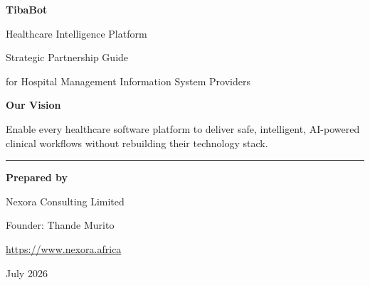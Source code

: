 
\thispagestyle{empty}

\vspace*{1cm}

{\Huge\bfseries\color{Primary}
TibaBot
}

\vspace{3mm}

{\LARGE Healthcare Intelligence Platform}

\vspace{8mm}

{\Large
Strategic Partnership Guide
}

\vspace{2mm}

{\large
for Hospital Management Information System Providers
}

\vfill

\begin{center}


\end{center}

\vfill

\begin{callout}

\textbf{Our Vision}

Enable every healthcare software platform to deliver safe, intelligent, AI-powered clinical workflows without rebuilding their technology stack.

\end{callout}

\vfill

\hrule

\vspace{2mm}

\textbf{Prepared by}

\vspace{2mm}

Nexora Consulting Limited

\vspace{1mm}

Founder: Thande Murito

\vspace{1mm}

\url{https://www.nexora.africa}

\vspace{1mm}

July 2026
